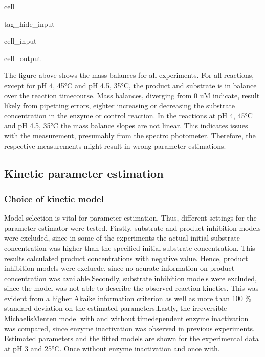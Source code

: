 \documentclass[letterpaper,10pt,english]{jupyterBook}
\begin{document}
\begin{sphinxuseclass}{cell}
\begin{sphinxuseclass}{tag_hide_input}
\begin{sphinxVerbatimInput}
\begin{sphinxuseclass}{cell_input}
\end{sphinxuseclass}\end{sphinxVerbatimInput}
\begin{sphinxVerbatimOutput}

\begin{sphinxuseclass}{cell_output}
\noindent{}

\end{sphinxuseclass}\end{sphinxVerbatimOutput}

\end{sphinxuseclass}
\end{sphinxuseclass}
\sphinxAtStartPar
The figure above shows the mass balances for all experiments. For all reactions, except for pH 4, 45°C and pH 4.5, 35°C, the product and substrate is in balance over the reaction time\sphinxhyphen{}course. Mass balances, diverging from 0 uM indicate, result likely from pipetting errors, eighter increasing or decreasing the substrate concentration in the enzyme\sphinxhyphen{} or control reaction. In the reactions at pH 4, 45°C and pH 4.5, 35°C the mass balance slopes are not linear. This indicates issues with the measurement, presumably from the spectro photometer. Therefore, the respective measurements might result in wrong parameter estimations.


\subsection{Kinetic parameter estimation}
\label{\detokenize{scenarios/SLAC_kinetic_characterization:kinetic-parameter-estimation}}

\subsubsection{Choice of kinetic model}
\label{\detokenize{scenarios/SLAC_kinetic_characterization:choice-of-kinetic-model}}
\sphinxAtStartPar
Model selection is vital for parameter estimation. Thus, different settings for the parameter estimator were tested. Firstly, substrate and product inhibition models were excluded, since in some of the experiments the actual initial substrate concentration was higher than the specified initial substrate concentration. This results calculated product concentrations with negative value. Hence, product inhibition models were excluede, since no acurate information on product concentration was available.Secondly, substrate inhibition models were excluded, since the model was not able to describe the observed reaction kinetics. This was evident from a higher Akaike information criterion as well as more than 100 \% standard deviation on the estimated parameters.Lastly, the irreversible Michaelis\sphinxhyphen{}Menten model with and without time\sphinxhyphen{}dependent enzyme inactivation was compared, since enzyme inactivation was observed in previous experiments. Estimated parameters and the fitted models are shown for the experimental data at pH 3 and 25°C. Once without enzyme inactivation and once with.
\end{document}
